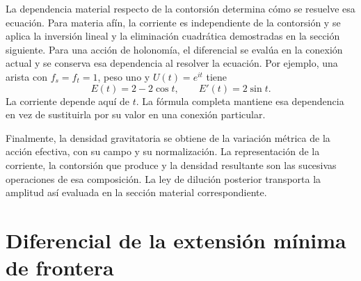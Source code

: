 La dependencia material respecto de la contorsión determina cómo se
resuelve esa ecuación. Para materia afín, la corriente es independiente
de la contorsión y se aplica la inversión lineal y la eliminación
cuadrática demostradas en la sección siguiente. Para una acción de
holonomía, el diferencial se evalúa en la conexión actual y se conserva
esa dependencia al resolver la ecuación. Por ejemplo, una arista con
\(f_s=f_t=1\), peso uno y \(U(t)=e^{it}\) tiene
\[
 E(t)=2-2\cos t,\qquad E'(t)=2\sin t.
\]
La corriente depende aquí de \(t\). La fórmula completa mantiene
esa dependencia en vez de sustituirla por su valor en una conexión
particular.

Finalmente, la densidad gravitatoria se obtiene de la variación
métrica de la acción efectiva, con su campo y su normalización.
La representación de la corriente, la contorsión que produce y la
densidad resultante son las sucesivas operaciones de esa composición.
La ley de dilución posterior transporta la amplitud así evaluada en
la sección material correspondiente.




\chapter{Diferencial de la extensión mínima de frontera}
\label{x_reciprocidad:vii:sec:corriente-extension-minima}


